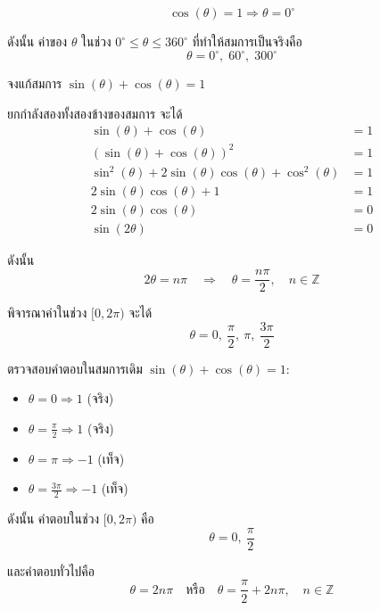 \[
\cos(\theta) = 1
\Rightarrow \theta = 0^{\circ}
\]

ดังนั้น ค่าของ \(\theta\) ในช่วง \(0^{\circ} \leq \theta \leq 360^{\circ}\) ที่ทำให้สมการเป็นจริงคือ
\[
\theta = 0^{\circ},\; 60^{\circ},\; 300^{\circ}
\]

\newpage
\begin{examplebox}
	จงแก้สมการ $\sin(\theta) + \cos(\theta) = 1$
\end{examplebox}

\solution ยกกำลังสองทั้งสองข้างของสมการ จะได้
$$
\begin{aligned}
	\sin(\theta) + \cos(\theta) &= 1 \\
	(\sin(\theta) + \cos(\theta))^{2} &= 1 \\
	\sin^{2}(\theta) + 2\sin(\theta)\cos(\theta) + \cos^{2}(\theta) &= 1 \\
	2\sin(\theta)\cos(\theta) + 1 &= 1 \\
	2\sin(\theta)\cos(\theta) &= 0 \\
	\sin(2\theta) &= 0
\end{aligned}
$$

ดังนั้น
$$
2\theta = n\pi \quad \Rightarrow \quad \theta = \frac{n\pi}{2}, \quad n \in \mathbb{Z}
$$

พิจารณาค่าในช่วง $[0,2\pi)$ จะได้
$$
\theta = 0,\ \frac{\pi}{2},\ \pi,\ \frac{3\pi}{2}
$$

ตรวจสอบคำตอบในสมการเดิม $\sin(\theta) + \cos(\theta) = 1$:
\begin{itemize}
	\item $\theta = 0 \Rightarrow 1$ (จริง)
	\item $\theta = \frac{\pi}{2} \Rightarrow 1$ (จริง)
	\item $\theta = \pi \Rightarrow -1$ (เท็จ)
	\item $\theta = \frac{3\pi}{2} \Rightarrow -1$ (เท็จ)
\end{itemize}

ดังนั้น คำตอบในช่วง $[0,2\pi)$ คือ
$$
\theta = 0,\ \frac{\pi}{2}
$$

และคำตอบทั่วไปคือ
$$
\theta = 2n\pi \quad \text{หรือ} \quad \theta = \frac{\pi}{2} + 2n\pi,\quad n \in \mathbb{Z}
$$

\newpage
